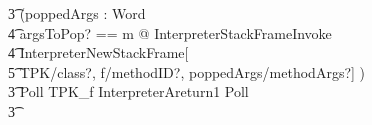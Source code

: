 \begin{figure}[tp!]
\begin{circusaction}
    \t3 (\circvar poppedArgs : \seq Word \circspot \\
    \t4 \lschexpract \exists argsToPop? == m @ InterpreterStackFrameInvoke \rschexpract \circseq \\
    \t4 \lschexpract InterpreterNewStackFrame[\\
    \t5 TPK/class?, f/methodID?, poppedArgs/methodArgs?] \rschexpract) \circseq \\
    \t3 Poll \circseq TPK\_f \circseq \lschexpract InterpreterAreturn1 \rschexpract \circseq Poll \circseq \\
    \t3 {} \cdots {} \\

\end{circusaction}
\end{figure}
